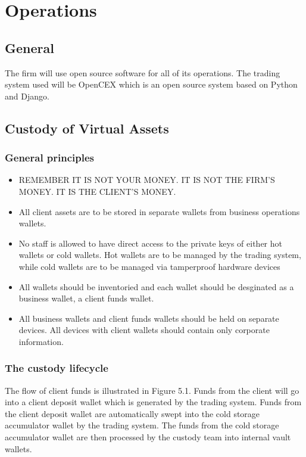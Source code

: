 \chapter{Operations}

\section{General}
The firm will use open source software for all of its operations.  The
trading system used will be OpenCEX which is an open source system
based on Python and Django.

\section{Custody of Virtual Assets}

\subsection{General principles}
\begin{itemize}
\item REMEMBER IT IS NOT YOUR MONEY.  IT IS NOT THE FIRM'S MONEY.  IT IS THE CLIENT'S MONEY.
\end{itemize}

\begin{itemize}
  \item All client assets are to be stored in separate wallets from
    business operations wallets.
  \item No staff is allowed to have direct access to the private keys
    of either hot
    wallets or cold wallets.  Hot wallets are to be managed by the
    trading system, while cold wallets are to be managed via
    tamperproof hardware devices 
  \item All wallets should be inventoried and each wallet should be desginated
    as a business wallet, a client funds wallet.
  \item All business wallets and client funds wallets should be held on
separate devices.  All devices with client wallets should contain only
corporate information.
\end{itemize}

\subsection{The custody lifecycle}
The flow of client funds is illustrated in Figure 5.1.  Funds from the
client will go into a client deposit wallet which is generated by the
trading system.  Funds from the client deposit wallet are
automatically swept into the cold storage accumulator wallet by the trading
system.  The funds from the cold storage accumulator wallet are then
processed by the custody team into internal vault wallets.

